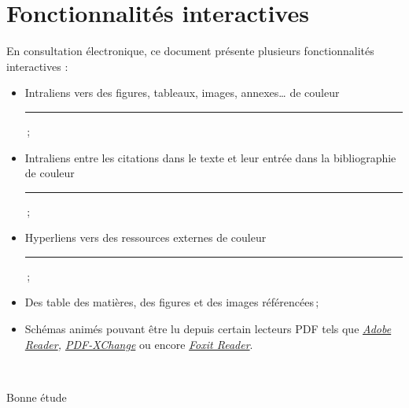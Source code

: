\section{Fonctionnalités interactives}

En consultation électronique, ce document présente plusieurs fonctionnalités interactives :

\begin{itemize} %
\item Intraliens vers des figures, tableaux, images, annexes\ldots{} de couleur \textcolor{ForestGreen}{\rule{1.5em}{1.2ex}}\,;
\item Intraliens entre les citations dans le texte et leur entrée dans
  la bibliographie de couleur \textcolor{Red}{\rule{1.5em}{1.2ex}}\,;
\item Hyperliens vers des ressources externes de couleur \textcolor{Blue}{\rule{1.5em}{1.2ex}}\,;
\item Des table des matières, des figures et des images référencées\,;
\item Schémas animés pouvant être lu depuis certain lecteurs PDF tels que \emph{\href{https://acrobat.adobe.com/fr/fr/acrobat/pdf-reader.html}{Adobe Reader}, \href{http://www.pdfxchange.fr}{PDF-XChange}} ou encore \emph{\href{https://www.foxitsoftware.com/fr/pdf-reader/}{Foxit Reader}}.
\end{itemize}
~\\[4cm] %

\begin{flushright} %
Bonne étude
\end{flushright}

%